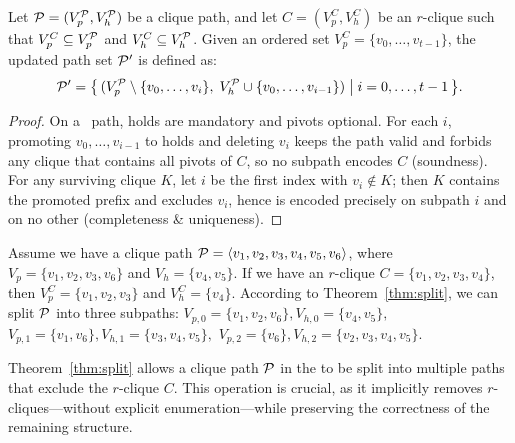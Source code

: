 \begin{theorem}\label{thm:split}

Let $\TPath = (V_p^{\TPath}, V_h^{\TPath})$ be a clique path, and let $C = (V_p^{C}, V_h^{C})$ be an $r$-clique such that $V_p^{C} \subseteq V_p^{\TPath}$ and $V_h^{C} \subseteq V_h^{\TPath}$. 
Given an ordered set $V_p^{C} = \{v_0, \ldots, v_{t-1}\}$, the updated path set $\TPath'$ is defined as:
\[
  \TPath' = \bigl\{\, (V_p^{\TPath} \setminus \{v_0, \ldots, v_i\},\; V_h^{\TPath} \cup \{v_0, \ldots, v_{i-1}\}) \;\big|\; i = 0, \ldots, t-1 \,\bigr\}.
\]
\end{theorem}


\begin{proof}
On a \cpi\ path, holds are mandatory and pivots optional. For each $i$, promoting $v_0,\ldots,v_{i-1}$ to holds and deleting $v_i$ keeps the path valid and forbids any clique that contains all pivots of $C$, so no subpath encodes $C$ (soundness). For any surviving clique $K$, let $i$ be the first index with $v_i\notin K$; then $K$ contains the promoted prefix and excludes $v_i$, hence is encoded precisely on subpath $i$ and on no other (completeness \& uniqueness).
\end{proof}

\begin{example}
\label{ex:split_example}

Assume we have a clique path $\TPath = \langle v_1, v_2, v_3, v_4, v_5, v_6 \rangle$,
where $V_p = \{v_1, v_2, v_3, v_6\}$ and $V_h = \{v_4, v_5\}$.
If we have an $r$-clique $C = \{v_1, v_2, v_3, v_4\}$, 
then $V_p^C = \{v_1, v_2, v_3\}$ and $V_h^C = \{v_4\}$.
According to Theorem~\ref{thm:split}, we can split $\TPath$ into three subpaths:
$V_{p,0} = \{v_1, v_2,v_6\},  V_{h,0} = \{v_4,v_5\},$
$V_{p,1} = \{v_1,v_6\}, V_{h,1} = \{v_3,v_4,v_5\},$
$V_{p,2} = \{v_6\}, V_{h,2} = \{v_2,v_3,v_4,v_5\}.$

\end{example}

\begin{remark}
Theorem~\ref{thm:split} allows a clique path $\TPath$ in the \cpi to be split into multiple paths that exclude the $r$-clique $C$. 
This operation is crucial, as it implicitly removes $r$-cliques—without explicit enumeration—while preserving the correctness of the remaining structure.
\end{remark}

